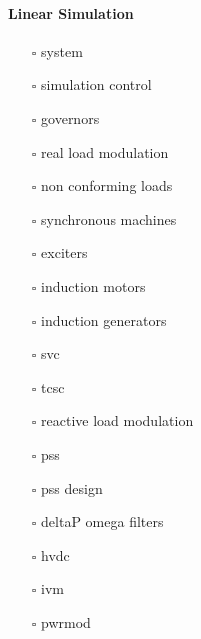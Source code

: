 \documentclass[12pt]{article}
\begin{document}
\begin{multicols}{2}
\paragraph{Linear Simulation}
\begin{itemize}
	\item[$\square$] system 
	\item[$\square$] simulation control
	\item[$\square$] governors
	\item[$\square$] real load modulation 
	\item[$\square$] non conforming loads
	\item[$\square$] synchronous machines	
	\item[$\square$] exciters	 	 
	\item[$\square$] induction motors	 
	\item[$\square$] induction generators	 
	\item[$\square$] svc	 
	\item[$\square$] tcsc	 
	\item[$\square$] reactive load modulation
	\item[$\square$] pss
	\item[$\square$] pss design	  
	\item[$\square$] deltaP omega filters
	\item[$\square$] hvdc
	\item[$\square$] ivm	  
	\item[$\square$] pwrmod
\end{itemize}
\vfill\null
\end{multicols}
\end{document}
